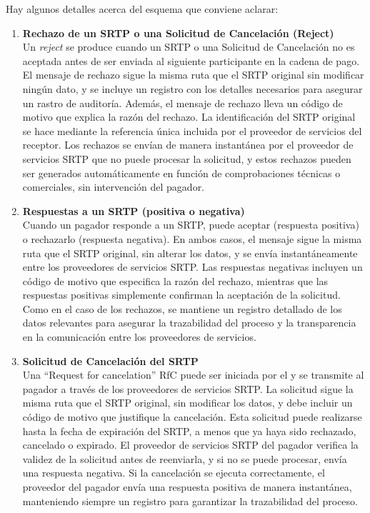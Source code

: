 Hay algunos detalles acerca del esquema que conviene aclarar:
\begin{enumerate}
  \item \textbf{Rechazo de un SRTP o una Solicitud de Cancelación (Reject)} \\
        Un \textit{reject} se produce cuando un SRTP o una Solicitud de Cancelación no es aceptada antes de ser enviada al siguiente participante en la cadena de pago. El mensaje de rechazo sigue la misma ruta que el SRTP original sin modificar ningún dato, y se incluye un registro con los detalles necesarios para asegurar un rastro de auditoría. Además, el mensaje de rechazo lleva un código de motivo que explica la razón del rechazo. La identificación del SRTP original se hace mediante la referencia única incluida por el proveedor de servicios del receptor. Los rechazos se envían de manera instantánea por el proveedor de servicios SRTP que no puede procesar la solicitud, y estos rechazos pueden ser generados automáticamente en función de comprobaciones técnicas o comerciales, sin intervención del pagador.

  \item \textbf{Respuestas a un SRTP (positiva o negativa)} \\
        Cuando un pagador responde a un SRTP, puede aceptar (respuesta positiva) o rechazarlo (respuesta negativa). En ambos casos, el mensaje sigue la misma ruta que el SRTP original, sin alterar los datos, y se envía instantáneamente entre los proveedores de servicios SRTP. Las respuestas negativas incluyen un código de motivo que especifica la razón del rechazo, mientras que las respuestas positivas simplemente confirman la aceptación de la solicitud. Como en el caso de los rechazos, se mantiene un registro detallado de los datos relevantes para asegurar la trazabilidad del proceso y la transparencia en la comunicación entre los proveedores de servicios.

  \item \textbf{Solicitud de Cancelación del SRTP} \\
        Una “Request for cancelation” RfC puede ser iniciada por el y se transmite al pagador a través de los proveedores de servicios SRTP. La solicitud sigue la misma ruta que el SRTP original, sin modificar los datos, y debe incluir un código de motivo que justifique la cancelación. Esta solicitud puede realizarse hasta la fecha de expiración del SRTP, a menos que ya haya sido rechazado, cancelado o expirado. El proveedor de servicios SRTP del pagador verifica la validez de la solicitud antes de reenviarla, y si no se puede procesar, envía una respuesta negativa. Si la cancelación se ejecuta correctamente, el proveedor del pagador envía una respuesta positiva de manera instantánea, manteniendo siempre un registro para garantizar la trazabilidad del proceso.
\end{enumerate}
